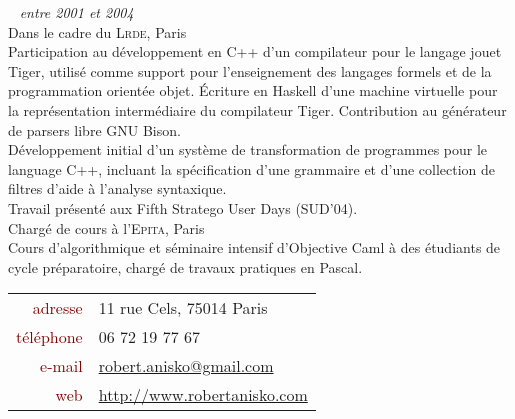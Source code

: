 \documentclass[a4paper, 10pt]{article}
\newcommand{\myurl}[1]{\fontspec{Gill Sans}\fontsize{10pt}{0pt}\selectfont #1}%
\begin{document}
\begin{minipage}[t]{0.59\linewidth}
    \par ~ \hfill \textcolor{medg}{\textit{entre 2001 et 2004}}\\[5pt]
    {\large Dans le cadre du \textsc{Lrde}, Paris}\\[5pt]
    Participation au d\'eveloppement en C++ d'un compilateur pour le langage jouet Tiger, utilis\'e comme support pour l'enseignement des langages formels et de la programmation orient\'ee objet. \'Ecriture en Haskell d'une machine virtuelle pour la repr\'esentation interm\'ediaire du compilateur Tiger. Contribution au g\'en\'erateur de parsers libre GNU Bison.\\[5pt]
    D\'eveloppement initial d'un syst\`eme de transformation de programmes pour le language C++, incluant la sp\'ecification d'une grammaire et d'une collection de filtres d'aide \`a l'analyse syntaxique.\\[5pt]
    Travail pr\'esent\'e aux Fifth Stratego User Days (SUD'04).\\

    {\large Charg\'e de cours \`a l'\textsc{Epita}, Paris}\\[5pt]
    Cours d'algorithmique et s\'eminaire intensif d'Objective Caml \`a des \'etudiants de cycle pr\'eparatoire, charg\'e de travaux pratiques en Pascal.

    \vspace{6em}

    {\large 
	\begin{tabular}{@{}rl}
    \textcolor{maroon}{adresse} &
    11 rue Cels, 75014 Paris\\
    \textcolor{maroon}{t\'el\'ephone} &
    06 72 19 77 67\\
    \textcolor{maroon}{e-mail} &
    {\myurl \url{robert.anisko@gmail.com}}\\
    \textcolor{maroon}{web} &
    {\myurl \url{http://www.robertanisko.com}}\\
    \end{tabular}}
  \end{minipage}
  \hfill
\end{document}
